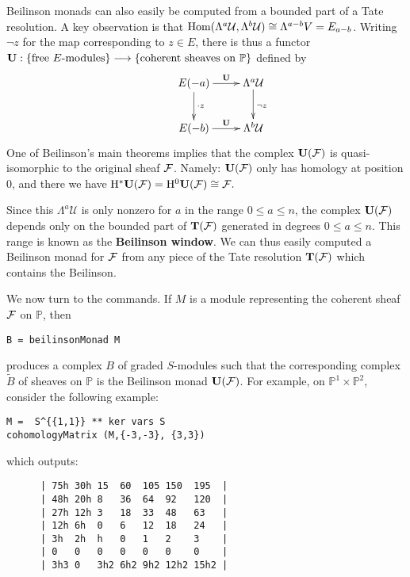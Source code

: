 \documentclass[twoside,12pt, leqno]{amsart}
\def\PP{{\mathbb P}}
\DeclareMathOperator{\rH}{{\rm H}}
\def\bT{{\bf T}}
\def\bU{{\bf U}}
\def\rH{{\rm H}}
\def\CU{{\mathcal U}}
\begin{document}
Beilinson monads can also easily be computed from a bounded part of a Tate resolution.  A key observation is that $\Hom(\Lambda^a \CU,\Lambda^b\CU) \cong \Lambda^{a-b} V=E_{a-b}$.  Writing $\neg z$ for the map corresponding to $z\in E$, there is thus a functor
$
\bU: \{ \hbox{free $E$-modules}\} \longrightarrow \{ \hbox{coherent sheaves on $\PP$} \}  \\
$ defined by
\[
\xymatrix{
&E(-a)\ar[r]^-{\bU}\ar[d]^-{\cdot z}&\Lambda^a \CU\ar[d]^{\neg z}\\
&E(-b)\ar[r]^-{\bU}&\Lambda^b \CU\\
}
\]
One of Beilinson's main theorems implies that the complex $\bU(\sF)$ is quasi-isomorphic to the original sheaf ${\mathcal F}$.  Namely: $\bU(\sF)$ only has homology at position $0$, and there we have $ \rH^* \bU(\sF) = \rH^0 \bU(\sF) \cong \sF.$


Since this $\Lambda^a \CU$ is only nonzero for $a$ in the range $0 \le a \le n$, the complex $\bU(\sF)$ depends only on the bounded part of $\bT(\sF)$ generated in degrees $0\le a \le n$.  This range is known as the {\bf Beilinson window}.  We can thus easily computed a Beilinson monad for ${\mathcal F}$ from any piece of the Tate resolution $\bT(\sF)$ which contains the Beilinson.

We now turn to the commands.  If $M$ is a module representing the coherent sheaf ${\mathcal F}$ on $\PP$, then
\begin{verbatim}
B = beilinsonMonad M
\end{verbatim}
produces a complex $B$ of graded $S$-modules such that the corresponding complex $\widetilde{B}$ of sheaves on $\PP$ is the Beilinson monad $\bU(\sF)$.  For example, on $\PP^1\times \PP^2$, consider the following example:
\begin{verbatim}
M =  S^{{1,1}} ** ker vars S 
cohomologyMatrix (M,{-3,-3}, {3,3})
\end{verbatim}
which outputs:
\begin{verbatim}
      | 75h 30h 15  60  105 150  195  |
      | 48h 20h 8   36  64  92   120  |
      | 27h 12h 3   18  33  48   63   |
      | 12h 6h  0   6   12  18   24   |
      | 3h  2h  h   0   1   2    3    |
      | 0   0   0   0   0   0    0    |
      | 3h3 0   3h2 6h2 9h2 12h2 15h2 |
\end{verbatim}
     
\end{document}
